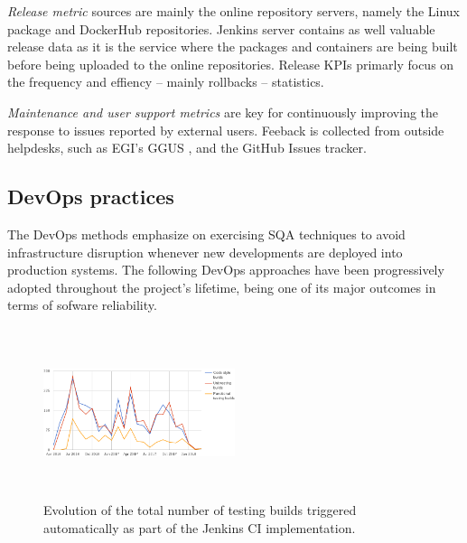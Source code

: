 \documentclass[journal]{IEEEtran}
\begin{document}
\textit{Release metric} sources are mainly the online repository servers, namely the 
Linux package \cite{indigo-pkg-repo} and DockerHub \cite{indigo-dockerhub} repositories. Jenkins 
server contains as well valuable release data as it is the service where the packages
and containers are being built before being uploaded to the online repositories. Release
KPIs primarly focus on the frequency and effiency -- mainly rollbacks -- statistics.

\textit{Maintenance and user support metrics} are key for continuously improving the response
to issues reported by external users. Feeback is collected from outside helpdesks, such as 
EGI's GGUS \cite{ggus}, and the GitHub Issues tracker.

\subsection{DevOps practices}
\label{sec:devops}

The DevOps methods emphasize on exercising SQA techniques to avoid infrastructure
disruption whenever new developments are deployed into production systems. The 
following DevOps approaches have been progressively adopted throughout the project's
lifetime, being one of its major outcomes in terms of sofware reliability.

\begin{figure}[ht]
\centering
\includegraphics[width=0.5\textwidth, height=50mm]{images/jenkins_CI_builds.png}
\caption{Evolution of the total number of testing builds triggered automatically as part of the Jenkins CI implementation.}
\label{fig:fig_jenkins_CI_builds}
\end{figure}
\end{document}
